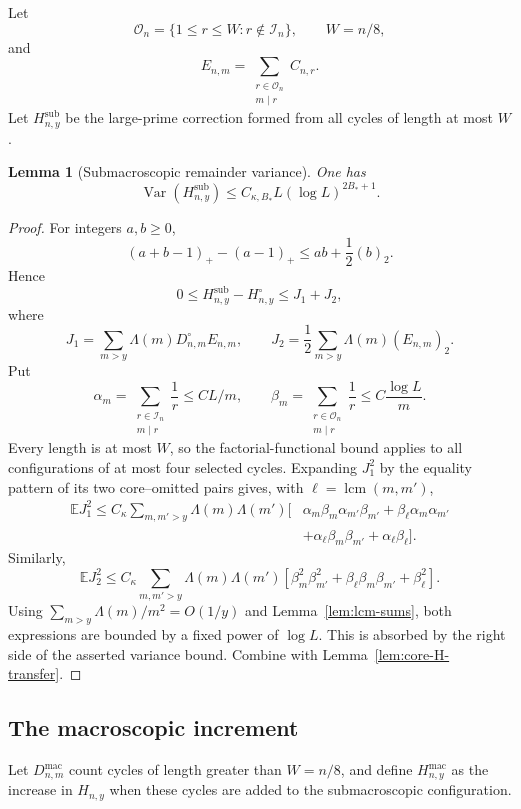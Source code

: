\documentclass[11pt]{article}
\newtheorem{lemma}[theorem]{Lemma}
\theoremstyle{remark}
\newcommand{\Ee}{\mathbb E}
\newcommand{\Var}{\operatorname{Var}}
\newcommand{\lcm}{\operatorname{lcm}}
\begin{document}
Let
\[
 \mathcal O_n=\{1\le r\le W:r\notin\mathcal I_n\},
 \qquad W=n/8,
\]
and
\[
 E_{n,m}=\sum_{\substack{r\in\mathcal O_n\\m\mid r}}C_{n,r}.
\]
Let $H_{n,y}^{\mathrm{sub}}$ be the large-prime correction formed from all
cycles of length at most $W$.

\begin{lemma}[Submacroscopic remainder variance]
\label{lem:sub-H-variance}
One has
\[
 \Var(H_{n,y}^{\mathrm{sub}})
 \le C_{\kappa,B_*}L(\log L)^{2B_*+1}.
\]
\end{lemma}

\begin{proof}
For integers $a,b\ge0$,
\[
 (a+b-1)_+-(a-1)_+\le ab+\frac12(b)_2.
\]
Hence
\[
 0\le H_{n,y}^{\mathrm{sub}}-H_{n,y}^\circ\le J_1+J_2,
\]
where
\[
 J_1=\sum_{m>y}\Lambda(m)D_{n,m}^\circ E_{n,m},
 \qquad
 J_2=\frac12\sum_{m>y}\Lambda(m)(E_{n,m})_2.
\]
Put
\[
 \alpha_m=\sum_{\substack{r\in\mathcal I_n\\m\mid r}}\frac1r\le CL/m,
 \qquad
 \beta_m=\sum_{\substack{r\in\mathcal O_n\\m\mid r}}\frac1r
 \le C\frac{\log L}{m}.
\]
Every length is at most $W$, so the factorial-functional bound applies to
all configurations of at most four selected cycles.  Expanding $J_1^2$ by
the equality pattern of its two core--omitted pairs gives, with
$\ell=\lcm(m,m')$,
\begin{align*}
 \Ee J_1^2\le C_\kappa\sum_{m,m'>y}\Lambda(m)\Lambda(m')\bigl[
 &\alpha_m\beta_m\alpha_{m'}\beta_{m'}
 +\beta_\ell\alpha_m\alpha_{m'}\\
 &+\alpha_\ell\beta_m\beta_{m'}
 +\alpha_\ell\beta_\ell\bigr].
\end{align*}
Similarly,
\[
 \Ee J_2^2\le C_\kappa\sum_{m,m'>y}\Lambda(m)\Lambda(m')
 \left[\beta_m^2\beta_{m'}^2
 +\beta_\ell\beta_m\beta_{m'}+\beta_\ell^2\right].
\]
Using $\sum_{m>y}\Lambda(m)/m^2=O(1/y)$ and
Lemma~\ref{lem:lcm-sums}, both expressions are bounded by a fixed power of
$\log L$.  This is absorbed by the right side of the asserted variance
bound.  Combine with Lemma~\ref{lem:core-H-transfer}.
\end{proof}

\subsection{The macroscopic increment}

Let $D_{n,m}^{\mathrm{mac}}$ count cycles of length greater than $W=n/8$,
and define $H_{n,y}^{\mathrm{mac}}$ as the increase in $H_{n,y}$ when these
cycles are added to the submacroscopic configuration.
\end{document}
